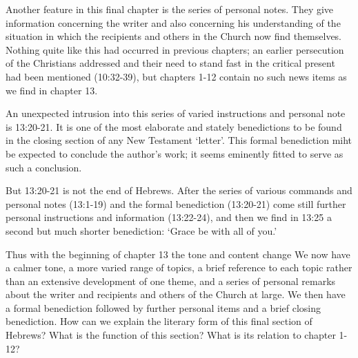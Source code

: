 Another feature in this final chapter is the series of personal notes.
They give information concerning the writer and also concerning his
understanding of the situation in which the recipients and others in the Church
now find themselves.
Nothing quite like this had occurred in previous chapters; an earlier
persecution of the Christians addressed and their need to stand fast in the
critical present had been mentioned (10:32-39), but chapters 1-12 contain no
such news items as we find in chapter 13.

An unexpected intrusion into this series of varied instructions and personal
note is 13:20-21.
It is one of the most elaborate and stately benedictions to be found in the
closing section of any New Testament `letter'.
This formal benediction miht be expected to conclude the author's work; it
seems eminently fitted to serve as such a conclusion.

But 13:20-21 is not the end of Hebrews.
After the series of various commands and personal notes (13:1-19) and the
formal benediction (13:20-21) come still further personal instructions and
information (13:22-24), and then we find in 13:25 a second but much shorter
benediction: `Grace be with all of you.'

Thus with the beginning of chapter 13 the tone and content change
We now have a calmer tone, a more varied range of topics, a brief reference to
each topic rather than an extensive development of one theme, and a series of
personal remarks about the writer and recipients and others of the Church at
large.
We then have a formal benediction followed by further personal items and a
brief closing benediction.
How can we explain the literary form of this final section of Hebrews?
What is the function of this section? What is its relation to chapter 1-12?
